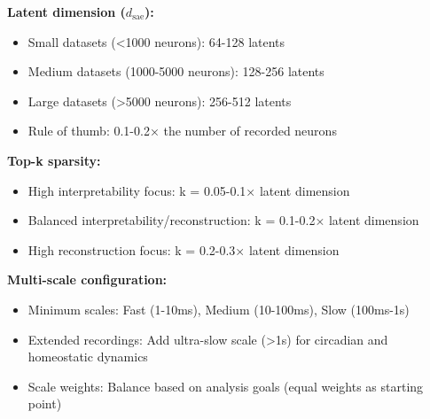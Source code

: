 \textbf{Latent dimension ($d_{\text{sae}}$):}
\begin{itemize}
\item Small datasets (<1000 neurons): 64-128 latents
\item Medium datasets (1000-5000 neurons): 128-256 latents  
\item Large datasets (>5000 neurons): 256-512 latents
\item Rule of thumb: 0.1-0.2× the number of recorded neurons
\end{itemize}

\textbf{Top-k sparsity:}
\begin{itemize}
\item High interpretability focus: k = 0.05-0.1× latent dimension
\item Balanced interpretability/reconstruction: k = 0.1-0.2× latent dimension
\item High reconstruction focus: k = 0.2-0.3× latent dimension
\end{itemize}

\textbf{Multi-scale configuration:}
\begin{itemize}
\item Minimum scales: Fast (1-10ms), Medium (10-100ms), Slow (100ms-1s)
\item Extended recordings: Add ultra-slow scale (>1s) for circadian and homeostatic dynamics
\item Scale weights: Balance based on analysis goals (equal weights as starting point)
\end{itemize}

